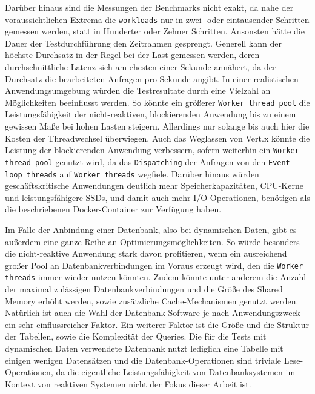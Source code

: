 Darüber hinaus sind die Messungen der Benchmarks nicht exakt, da nahe der voraussichtlichen Extrema die \verb|workloads|
nur in zwei- oder eintausender Schritten gemessen werden, statt in Hunderter oder Zehner Schritten.
Ansonsten hätte die Dauer der Testdurchführung den Zeitrahmen gesprengt.
Generell kann der höchste Durchsatz in der Regel bei der Last gemessen werden, deren durchschnittliche Latenz sich am ehesten
einer Sekunde annähert, da der Durchsatz die bearbeiteten Anfragen pro Sekunde angibt.
\newline\newline
In einer realistischen Anwendungsumgebung würden die Testresultate durch eine Vielzahl an Möglichkeiten beeinflusst werden.
So könnte ein größerer \verb|Worker thread pool| die Leistungsfähigkeit der nicht-reaktiven, blockierenden
Anwendung bis zu einem gewissen Maße bei hohen Lasten steigern. Allerdings nur solange bis auch hier die Kosten der Threadwechsel
überwiegen. Auch das Weglassen von Vert.x könnte die Leistung der blockierenden Anwendung verbessern, sofern weiterhin
ein \verb|Worker thread pool| genutzt wird, da das \verb|Dispatching| der Anfragen von den \verb|Event loop threads| auf
\verb|Worker threads| wegfiele. Darüber hinaus würden geschäftskritische Anwendungen deutlich mehr Speicherkapazitäten, CPU-Kerne und
leistungsfähigere SSDs, und damit auch mehr I/O-Operationen, benötigen als die beschriebenen Docker-Container zur Verfügung haben.

Im Falle der Anbindung einer Datenbank, also bei dynamischen Daten, gibt es außerdem eine ganze Reihe an Optimierungsmöglichkeiten.
So würde besonders die nicht-reaktive Anwendung stark davon profitieren, wenn ein ausreichend großer Pool an Datenbankverbindungen
im Voraus erzeugt wird, den die \verb|Worker threads| immer wieder nutzen könnten.
Zudem könnte unter anderem die Anzahl der maximal zulässigen
Datenbankverbindungen und die Größe des Shared Memory erhöht werden, sowie zusätzliche Cache-Mechanismen genutzt werden.
Natürlich ist auch die Wahl der Datenbank-Software je nach Anwendungszweck ein sehr einflussreicher Faktor.
\newline\newline
Ein weiterer Faktor ist die Größe und die Struktur der Tabellen, sowie die Komplexität der Queries.
Die für die Tests mit dynamischen Daten verwendete Datenbank nutzt lediglich eine Tabelle mit einigen wenigen Datensätzen und die
Datenbank-Operationen sind triviale Lese-Operationen,
da die eigentliche Leistungsfähigkeit von Datenbanksystemen im Kontext von reaktiven Systemen nicht der Fokus dieser Arbeit ist.

